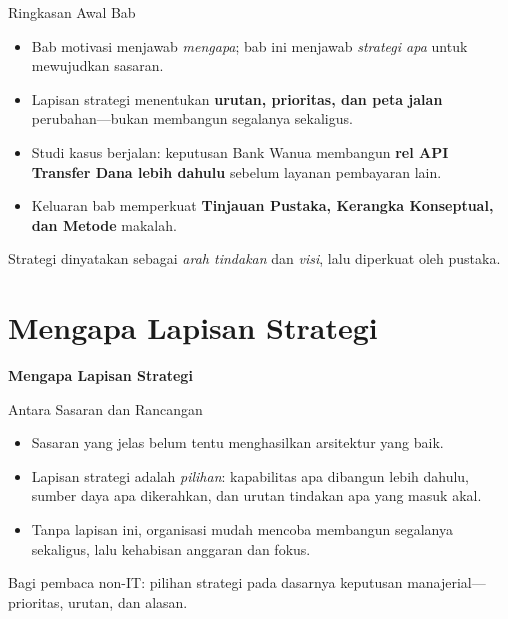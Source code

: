 \documentclass[aspectratio=169, table]{beamer}
\newcommand{\sectionframe}[1]{%
  \begin{frame}{\hfill}
    \centering
    \Huge{\textbf{#1}}
  \end{frame}
}
\newcommand{\takeaway}[1]{%
  \vspace{4pt}
  {\footnotesize #1}
}
\begin{document}
\begin{frame}{Ringkasan Awal Bab}
  \vspace{6pt}
  \begin{itemize}
    \item Bab motivasi menjawab \emph{mengapa}; bab ini menjawab \emph{strategi
          apa} untuk mewujudkan sasaran.
    \item Lapisan strategi menentukan \textbf{urutan, prioritas, dan peta jalan}
          perubahan---bukan membangun segalanya sekaligus.
    \item Studi kasus berjalan: keputusan Bank Wanua membangun \textbf{rel API
          Transfer Dana lebih dahulu} sebelum layanan pembayaran lain.
    \item Keluaran bab memperkuat \textbf{Tinjauan Pustaka, Kerangka Konseptual,
          dan Metode} makalah.
  \end{itemize}
  \takeaway{Strategi dinyatakan sebagai \emph{arah tindakan} dan \emph{visi},
  lalu diperkuat oleh pustaka.}
\end{frame}

\section{Mengapa Lapisan Strategi}
\sectionframe{Mengapa Lapisan Strategi}

\begin{frame}{Antara Sasaran dan Rancangan}
  \vspace{6pt}
  \begin{itemize}
    \item Sasaran yang jelas belum tentu menghasilkan arsitektur yang baik.
    \item Lapisan strategi adalah \emph{pilihan}: kapabilitas apa dibangun lebih
          dahulu, sumber daya apa dikerahkan, dan urutan tindakan apa yang masuk
          akal.
    \item Tanpa lapisan ini, organisasi mudah mencoba membangun segalanya
          sekaligus, lalu kehabisan anggaran dan fokus.
  \end{itemize}
  \takeaway{Bagi pembaca non-IT: pilihan strategi pada dasarnya keputusan
  manajerial---prioritas, urutan, dan alasan.}
\end{frame}
\end{document}
